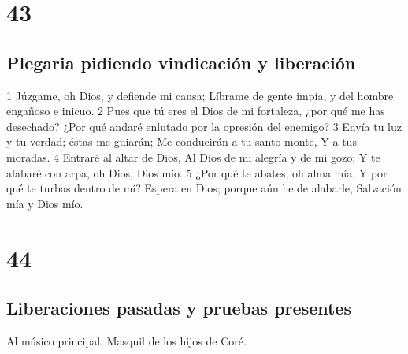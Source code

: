 \chapter{43}

\section*{Plegaria pidiendo vindicación y liberación}

1 Júzgame, oh Dios, y defiende mi causa;
Líbrame de gente impía, y del hombre engañoso e inicuo.
2 Pues que tú eres el Dios de mi fortaleza, ¿por qué me has desechado?
¿Por qué andaré enlutado por la opresión del enemigo?
3 Envía tu luz y tu verdad; éstas me guiarán;
Me conducirán a tu santo monte,
Y a tus moradas.
4 Entraré al altar de Dios,
Al Dios de mi alegría y de mi gozo;
Y te alabaré con arpa, oh Dios, Dios mío.
5 ¿Por qué te abates, oh alma mía,
Y por qué te turbas dentro de mí?
Espera en Dios; porque aún he de alabarle,
Salvación mía y Dios mío.

\chapter{44}

\section*{Liberaciones pasadas y pruebas presentes}

Al músico principal. Masquil de los hijos de Coré.

